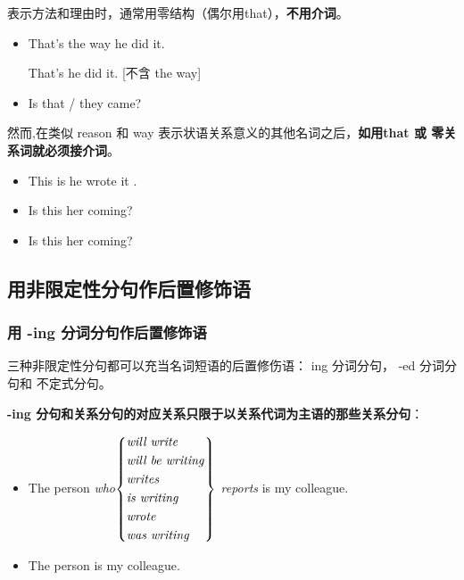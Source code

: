 表示方法和理由时，通常用零结构（偶尔用that），\textbf{不用介词}。
\begin{itemize}
\item That's the way  he did it.

  That's  he did it. [不含 the way]


\item Is that / they came?
\end{itemize}

然而,在类似 reason 和 way 表示状语关系意义的其他名词之后，\textbf{如用that 或
  零关系词就必须接介词}。
\begin{itemize}
\item This is  he wrote it .

\item Is this  her coming?
\item Is this  her coming?
\end{itemize}



\subsection{用非限定性分句作后置修饰语}

\subsubsection{用 -ing 分词分句作后置修饰语}

三种非限定性分句都可以充当名词短语的后置修伤语： ing 分词分句， -ed 分词分句和
不定式分句。

\textbf{-ing 分句和关系分句的对应关系只限于以关系代词为主语的那些关系分句}：
\begin{itemize}
\item The person \emph{who}$\left\{
    \begin{aligned}
      &\text{\emph{will write}} \\
      &\text{\emph{will be writing}} \\
      &\text{\emph{writes}} \\
      &\text{\emph{is writing}} \\
      &\text{\emph{wrote}} \\
      &\text{\emph{was writing}} \\
    \end{aligned}
  \right\} $ \emph{reports} is my colleague.

\item The person  is my colleague.
\end{itemize}

